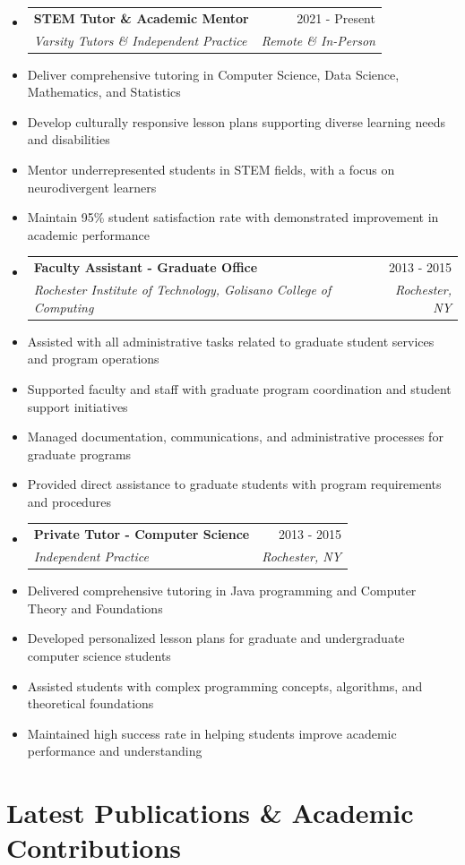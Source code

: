 \documentclass[10pt]{article}
\makeatletter
\newcommand{\resumeItem}[1]{\item\small{#1}}
\newcommand{\resumeSubheading}[4]{
  \vspace{-1pt}\item
    \begin{tabular*}{0.97\textwidth}[t]{l@{\extracolsep{\fill}}r}
      \textbf{#1} & #2 \\
      \textit{\small#3} & \textit{\small #4} \\
    \end{tabular*}\vspace{-5pt}
}
\makeatother
\begin{document}
\begin{itemize}[leftmargin=*]
\resumeSubheading
{STEM Tutor \& Academic Mentor}{2021 - Present}
{Varsity Tutors \& Independent Practice}{Remote \& In-Person}
\resumeItem{Deliver comprehensive tutoring in Computer Science, Data Science, Mathematics, and Statistics}
\resumeItem{Develop culturally responsive lesson plans supporting diverse learning needs and disabilities}
\resumeItem{Mentor underrepresented students in STEM fields, with a focus on neurodivergent learners}
\resumeItem{Maintain 95\% student satisfaction rate with demonstrated improvement in academic performance}

\resumeSubheading
{Faculty Assistant - Graduate Office}{2013 - 2015}
{Rochester Institute of Technology, Golisano College of Computing}{Rochester, NY}
\resumeItem{Assisted with all administrative tasks related to graduate student services and program operations}
\resumeItem{Supported faculty and staff with graduate program coordination and student support initiatives}
\resumeItem{Managed documentation, communications, and administrative processes for graduate programs}
\resumeItem{Provided direct assistance to graduate students with program requirements and procedures}

\resumeSubheading
{Private Tutor - Computer Science}{2013 - 2015}
{Independent Practice}{Rochester, NY}
\resumeItem{Delivered comprehensive tutoring in Java programming and Computer Theory and Foundations}
\resumeItem{Developed personalized lesson plans for graduate and undergraduate computer science students}
\resumeItem{Assisted students with complex programming concepts, algorithms, and theoretical foundations}
\resumeItem{Maintained high success rate in helping students improve academic performance and understanding}
\end{itemize}


\section{Latest Publications \& Academic Contributions}
\end{document}

